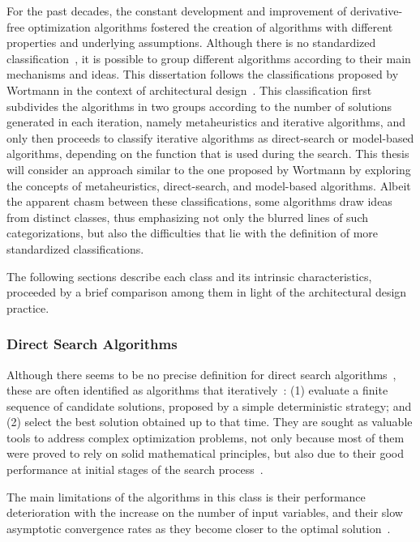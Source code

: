 	For the past decades, the constant development and improvement of derivative-free optimization algorithms fostered the creation of algorithms with different properties and underlying assumptions. Although there is no standardized classification~\cite{Rios2013, Wortmann2017ADO}, it is possible to group different algorithms according to their main mechanisms and ideas. This dissertation follows the classifications proposed by Wortmann in the context of architectural design~\cite{Wortmann2017ADO}.  This classification first subdivides the algorithms in two groups according to the number of solutions generated in each iteration, namely metaheuristics and iterative algorithms, and only then proceeds to classify iterative algorithms as direct-search or model-based algorithms, depending on the function that is used during the search. 
	This thesis will consider an approach similar to the one proposed by Wortmann by exploring the concepts of metaheuristics, direct-search, and model-based algorithms. Albeit the apparent chasm between these classifications, some algorithms draw ideas from distinct classes, thus emphasizing not only the blurred lines of such categorizations, but also the difficulties that lie with the definition of more standardized classifications. 
	
	The following sections describe each class and its intrinsic characteristics, proceeded by a brief comparison among them in light of the architectural design practice. 	
	
	\subsubsection{Direct Search Algorithms}
	\label{ssec:direct-search}
	
	Although there seems to be no precise definition for direct search algorithms~\cite{Kolda2003}, these are often identified as algorithms that iteratively~\cite{Kolda2003,Wortmann2016BBO}: (1) evaluate a finite sequence of candidate solutions, proposed by a simple deterministic strategy; and (2) select the best solution obtained up to that time. They are sought as valuable tools to address complex optimization problems, not only because most of them were proved to rely on solid mathematical principles, but also due to their good performance at initial stages of the search process~\cite{Rios2013, Wortmann2016BBO}. 
	
	The main limitations of the algorithms in this class is their performance deterioration with the increase on the number of input variables, and their slow asymptotic convergence rates as they become closer to the optimal solution~\cite{Kolda2003}.
	
